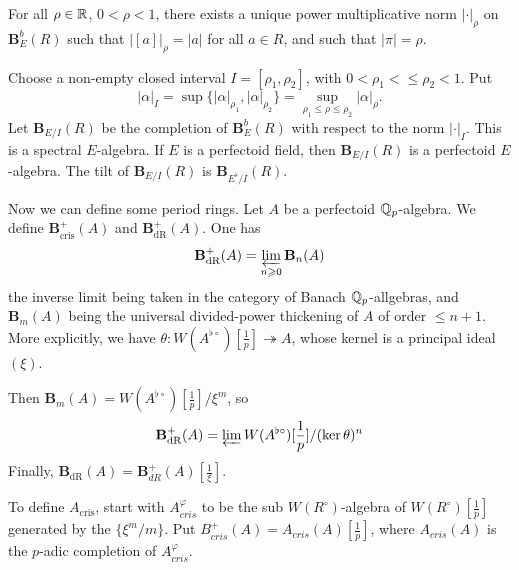 \documentclass{article}
\begin{document}
\begin{proposition}
For all $\rho\in \mathbb{R}$, $0<\rho<1$, there exists a unique power multiplicative norm 
$|\cdot |_\rho$ on $\mathbf B_E^b(R)$ such that 
$|[a]|_\rho = |a|$ for all $a\in R$, and such that 
$|\pi|=\rho$. 
\end{proposition}

Choose a non-empty closed interval $I=[\rho_1,\rho_2]$, with 
$0<\rho_1<\leqslant \rho_2<1$. Put 
\[
  |\alpha|_I = \sup\{|\alpha|_{\rho_1},|\alpha|_{\rho_2}\} = \sup_{\rho_1\leqslant \rho\leqslant \rho_2} |\alpha|_\rho .
\]
Let $\mathbf B_{E/I}(R)$ be the completion of $\mathbf B_E^b(R)$ with respect to 
the norm $|\cdot |_I$. This is a spectral $E$-algebra. If $E$ is a perfectoid 
field, then $\mathbf B_{E/I}(R)$ is a perfectoid $E$-algebra. The tilt of 
$\mathbf B_{E/I}(R)$ is $\mathbf B_{E^\flat/I}(R)$. 

Now we can define some period rings. Let $A$ be a perfectoid $\mathbb{Q}_p$-algebra. 
We define $\mathbf B_\text{cris}^+(A)$ and $\mathbf B_\text{dR}^+(A)$. 
One has 
\[
  \mathbf B_\text{dR}^+(A) = \varprojlim_{n\geqslant 0} \mathbf B_n(A)
\]
the inverse limit being taken in the category of Banach $\mathbb{Q}_p$-allgebras, and 
$\mathbf B_m(A)$ being the universal divided-power thickening of $A$ of order 
$\leqslant n+1$. More explicitly, we have 
$\theta:W(A^{\flat\circ})[\frac 1 p] \twoheadrightarrow A$, whose kernel is 
a principal ideal $(\xi)$. 

Then $\mathbf B_m(A) = W(A^{\flat\circ})[\frac 1 p]/\xi^m$, so 
\[
  \mathbf B_\text{dR}^+(A) = \varprojlim W(A^{\flat\circ})[\frac 1 p]/(\ker\theta)^n
\]
Finally, $\mathbf B_\text{dR}(A) = \mathbf B_{dR}^+(A)[\frac 1 \xi]$. 

To define $A_\text{cris}$, start with $A_{cris}^\varphi$ to be the sub $W(R^\circ)$-algebra of 
$W(R^\circ)[\frac 1 p]$ generated by the $\{\xi^m / m\}$. Put 
$B_{cris}^+(A) = A_{cris}(A)[\frac 1 p]$, where $A_{cris}(A)$ is the $p$-adic 
completion of $A_{cris}^\varphi$. 
\end{document}
